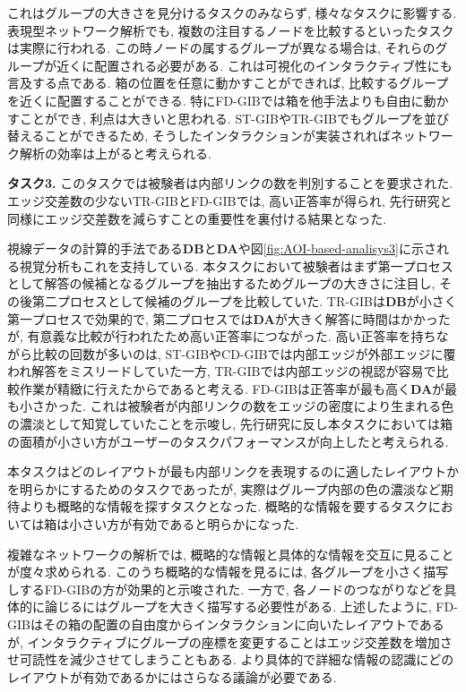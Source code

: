 \documentclass{kuee}
\begin{document}
これはグループの大きさを見分けるタスクのみならず, 様々なタスクに影響する.
表現型ネットワーク解析でも, 複数の注目するノードを比較するといったタスクは実際に行われる.
この時ノードの属するグループが異なる場合は, それらのグループが近くに配置される必要がある.
これは可視化のインタラクティブ性にも言及する点である.
箱の位置を任意に動かすことができれば, 比較するグループを近くに配置することができる.
特にFD-GIBでは箱を他手法よりも自由に動かすことができ, 利点は大きいと思われる.
ST-GIBやTR-GIBでもグループを並び替えることができるため, そうしたインタラクションが実装されればネットワーク解析の効率は上がると考えられる.

{\bf タスク3.} このタスクでは被験者は内部リンクの数を判別することを要求された.
エッジ交差数の少ないTR-GIBとFD-GIBでは, 高い正答率が得られ, 先行研究と同様にエッジ交差数を減らすことの重要性を裏付ける結果となった.

視線データの計算的手法である{\bf DB}と{\bf DA}や図\ref{fig:AOI-based-analisys3}に示される視覚分析もこれを支持している.
本タスクにおいて被験者はまず第一プロセスとして解答の候補となるグループを抽出するためグループの大きさに注目し, その後第二プロセスとして候補のグループを比較していた.
TR-GIBは{\bf DB}が小さく第一プロセスで効果的で, 第二プロセスでは{\bf DA}が大きく解答に時間はかかったが, 有意義な比較が行われたため高い正答率につながった.
高い正答率を持ちながら比較の回数が多いのは, ST-GIBやCD-GIBでは内部エッジが外部エッジに覆われ解答をミスリードしていた一方, TR-GIBでは内部エッジの視認が容易で比較作業が精緻に行えたからであると考える.
FD-GIBは正答率が最も高く{\bf DA}が最も小さかった.
これは被験者が内部リンクの数をエッジの密度により生まれる色の濃淡として知覚していたことを示唆し, 先行研究に反し本タスクにおいては箱の面積が小さい方がユーザーのタスクパフォーマンスが向上したと考えられる.

本タスクはどのレイアウトが最も内部リンクを表現するのに適したレイアウトかを明らかにするためのタスクであったが, 実際はグループ内部の色の濃淡など期待よりも概略的な情報を探すタスクとなった.
概略的な情報を要するタスクにおいては箱は小さい方が有効であると明らかになった.

複雑なネットワークの解析では, 概略的な情報と具体的な情報を交互に見ることが度々求められる.
このうち概略的な情報を見るには, 各グループを小さく描写しするFD-GIBの方が効果的と示唆された.
一方で, 各ノードのつながりなどを具体的に論じるにはグループを大きく描写する必要性がある.
上述したように, FD-GIBはその箱の配置の自由度からインタラクションに向いたレイアウトであるが, インタラクティブにグループの座標を変更することはエッジ交差数を増加させ可読性を減少させてしまうこともある.
より具体的で詳細な情報の認識にどのレイアウトが有効であるかにはさらなる議論が必要である.
\end{document}
